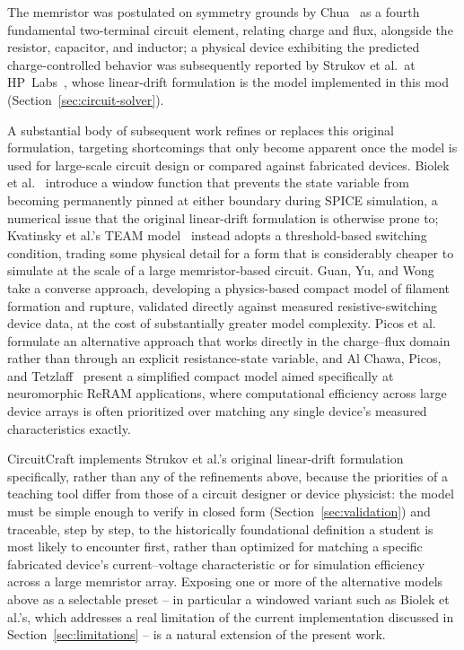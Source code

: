 The memristor was postulated on symmetry grounds by Chua~\cite{chua1971memristor} as a
fourth fundamental two-terminal circuit element, relating charge and flux, alongside the
resistor, capacitor, and inductor; a physical device exhibiting the predicted
charge-controlled behavior was subsequently reported by Strukov et al.\ at
HP~Labs~\cite{strukov2008missing}, whose linear-drift formulation is the model implemented
in this mod (Section~\ref{sec:circuit-solver}).

A substantial body of subsequent work refines or replaces this original formulation,
targeting shortcomings that only become apparent once the model is used for large-scale
circuit design or compared against fabricated devices. Biolek et
al.~\cite{biolek2009spice} introduce a window function that prevents the state variable
from becoming permanently pinned at either boundary during SPICE simulation, a numerical
issue that the original linear-drift formulation is otherwise prone to; Kvatinsky et
al.'s TEAM model~\cite{kvatinsky2013team} instead adopts a threshold-based switching
condition, trading some physical detail for a form that is considerably cheaper to simulate
at the scale of a large memristor-based circuit. Guan, Yu, and Wong~\cite{guan2012compact}
take a converse approach, developing a physics-based compact model of filament formation and
rupture, validated directly against measured resistive-switching device data, at the cost of
substantially greater model complexity. Picos et al.~\cite{picos2015chargeflux} formulate an
alternative approach that works directly in the charge--flux domain rather than through an
explicit resistance-state variable, and Al Chawa, Picos, and
Tetzlaff~\cite{alchawa2020simple} present a simplified compact model aimed specifically at
neuromorphic ReRAM applications, where computational efficiency across large device arrays
is often prioritized over matching any single device's measured characteristics exactly.

CircuitCraft implements Strukov et al.'s original linear-drift formulation specifically,
rather than any of the refinements above, because the priorities of a teaching tool differ
from those of a circuit designer or device physicist: the model must be simple enough to
verify in closed form (Section~\ref{sec:validation}) and traceable, step by step, to the
historically foundational definition a student is most likely to encounter first, rather
than optimized for matching a specific fabricated device's current--voltage characteristic
or for simulation efficiency across a large memristor array. Exposing one or more of the
alternative models above as a selectable preset -- in particular a windowed variant such as
Biolek et al.'s, which addresses a real limitation of the current implementation discussed
in Section~\ref{sec:limitations} -- is a natural extension of the present work.
